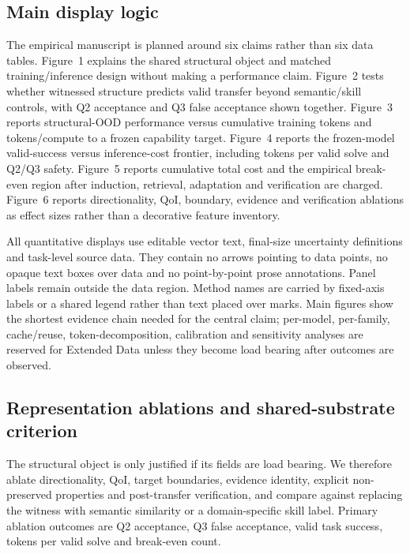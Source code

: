 \subsection{Main display logic}

The empirical manuscript is planned around six claims rather than six data tables. Figure~1 explains the shared structural object and matched training/inference design without making a performance claim. Figure~2 tests whether witnessed structure predicts valid transfer beyond semantic/skill controls, with Q2 acceptance and Q3 false acceptance shown together. Figure~3 reports structural-OOD performance versus cumulative training tokens and tokens/compute to a frozen capability target. Figure~4 reports the frozen-model valid-success versus inference-cost frontier, including tokens per valid solve and Q2/Q3 safety. Figure~5 reports cumulative total cost and the empirical break-even region after induction, retrieval, adaptation and verification are charged. Figure~6 reports directionality, QoI, boundary, evidence and verification ablations as effect sizes rather than a decorative feature inventory.

All quantitative displays use editable vector text, final-size uncertainty definitions and task-level source data. They contain no arrows pointing to data points, no opaque text boxes over data and no point-by-point prose annotations. Panel labels remain outside the data region. Method names are carried by fixed-axis labels or a shared legend rather than text placed over marks. Main figures show the shortest evidence chain needed for the central claim; per-model, per-family, cache/reuse, token-decomposition, calibration and sensitivity analyses are reserved for Extended Data unless they become load bearing after outcomes are observed.

\subsection{Representation ablations and shared-substrate criterion}

The structural object is only justified if its fields are load bearing. We therefore ablate directionality, QoI, target boundaries, evidence identity, explicit non-preserved properties and post-transfer verification, and compare against replacing the witness with semantic similarity or a domain-specific skill label. Primary ablation outcomes are Q2 acceptance, Q3 false acceptance, valid task success, tokens per valid solve and break-even count.

